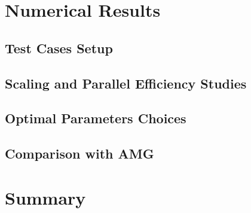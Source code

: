 \section{Numerical Results}

\subsection{Test Cases Setup}

\subsection{Scaling and Parallel Efficiency Studies}

\subsection{Optimal Parameters Choices}

\subsection{Comparison with AMG}

\section{Summary}